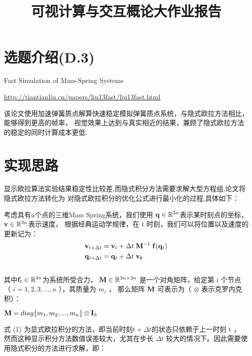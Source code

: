 \documentclass[]{ctexart}
\begin{document}
\title{可视计算与交互概论大作业报告}
\maketitle

\section{选题介绍(D.3)}
Fast Simulation of Mass-Spring Systems

\href{http://tiantianliu.cn/papers/liu13fast/liu13fast.html}{http://tiantianliu.cn/papers/liu13fast/liu13fast.html}

该论文使用加速弹簧质点解算快速稳定模拟弹簧质点系统，与隐式欧拉方法相比，能够得到更高的帧率，
视觉效果上达到与真实相近的结果，兼顾了隐式欧拉方法的稳定的同时计算成本更低.

\section{实现思路}

显示欧拉算法实验结果稳定性比较差,而隐式积分方法需要求解大型方程组,论文将隐式欧拉方法转化为
对隐式欧拉积分的优化公式进行最小化的过程,具体如下：

考虑具有n个点的三维Mass Spring系统，我们使用
$\bold{q} \in \mathbb{R}^{3n}$表示某时刻点的坐标，
$\bold{v} \in \mathbb{R}^{3n}$表示速度，
根据经典运动学规律，在 t 时刻，我们可以将位置以及速度的更新记为：
\begin{equation} \begin{aligned} &\bold{v}_{t+\Delta t} = \bold{v}_t + 
	\Delta t \; \bold{M}^{-1} \; \bold{f}(\bold{q}_t)\\ &\bold{q}_{t+\Delta t} =
	 \bold{q}_t + 
	\Delta t \; \bold{v_t} \end{aligned} \end{equation}\\
其中$ \bold{f}_t \in \mathbb{R}^{3n} $为系统所受合力，
$\bold{M} \in \mathbb{R}^{3n \times 3n}$ 是一个对角矩阵，给定第 i 个节点
（ $i = 1,2,3,...,n$ ），其质量为 $m_i$ ，
那么矩阵 $\bold{M}$ 可表示为（ $\otimes$ 表示克罗内克积）：

$\bold{M} = diag\{m_1,m_2,...,m_n\} \otimes \bold{I}_3 $

式 (1) 为显式欧拉积分的方法，即当前时刻$ t+\Delta t $的状态只依赖于上一时刻 t ，
然而这种显示积分方法数值误差较大，尤其在步长 $\Delta t $
较大的情况下。因此需要使用隐式积分的方法进行求解，即：
\end{document}
